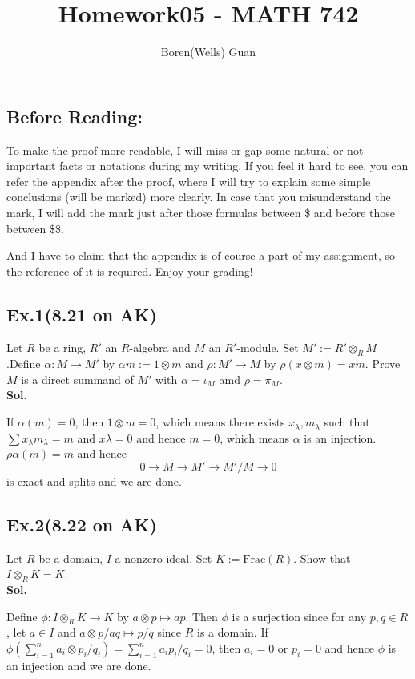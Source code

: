 \documentclass[lang=en,11pt,a4paper,citestyle =authoryear]{elegantpaper}
\title{Homework05 - MATH 742}
\author{Boren(Wells) Guan}
\begin{document}
\maketitle

\subsection*{Before Reading:}\par
To make the proof more readable, I will miss or gap some natural or not important facts or notations during my writing. If you feel it hard to see, you can refer the appendix after the proof, where I will try to explain some simple conclusions (will be marked) more clearly. In case that you misunderstand the mark, I will add the mark just after those formulas between \$ and before those between \$\$.\par
And I have to claim that the appendix is of course a part of my assignment, so the reference of it is required. Enjoy your grading!

\subsection*{Ex.1(8.21 on AK)} 
Let $R$ be a ring, $R'$ an $R$-algebra and $M$ an $R'$-module. Set $M':= R'\otimes_R M$.Define $\alpha:M\to M'$ by $\alpha m:= 1\otimes m$ and $\rho:M'\to M$ by $\rho(x\otimes m) = xm$. Prove $M$ is a direct summand of $M'$ with $\alpha = \iota_M$ amd $\rho = \pi_M$.
\vspace{0.5em}\\
\textbf{Sol.} \par
If $\alpha(m) = 0$, then $1\otimes m = 0$, which means there exists $x_{\lambda}, m_{\lambda}$ such that $\sum\limits x_{\lambda}m_{\lambda} = m$ and $x\lambda = 0$ and hence $m = 0$, which means $\alpha$ is an injection. $\rho\alpha(m) = m$ and hence
\[0 \to M \to M' \to M'/M \to 0 \]
is exact and splits and we are done.
\par 
\vspace{0.5em}

\subsection*{Ex.2(8.22 on AK)} 
Let $R$ be a domain, $I$ a nonzero ideal. Set $K:=\text{Frac}(R)$. Show that $I\otimes_R K = K$.
\vspace{0.5em}\\
\textbf{Sol.} \par
Define $\phi: I\otimes_R K \to K$ by $a\otimes p \mapsto ap$. Then $\phi$ is a surjection since for any $p,q\in R$, let $a\in I$ and $a\otimes p/aq \mapsto p/q$ since $R$ is a domain. If $\phi(\sum\limits_{i=1}^n a_i\otimes p_i/q_i) = \sum\limits_{i=1}^n a_ip_i/q_i = 0$, then $a_i = 0$ or $p_i=0$ and hence $\phi$ is an injection and we are done.
\par 
\vspace{0.5em}
\end{document}
